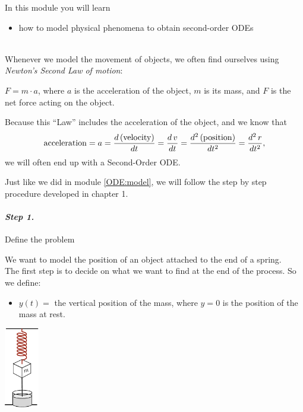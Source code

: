 In this module you will learn
\begin{itemize}
	\item how to model physical phenomena to obtain second-order ODEs
\end{itemize}

\hfill \\


Whenever we model the movement of objects, we often find ourselves using \emph{Newton's Second Law of motion}:

\begin{definition}
	$F = m \cdot a$, \quad
	where $a$ is the acceleration of the object, $m$ is its mass, and $F$ is the net force acting on the object.
\end{definition}

Because this ``Law'' includes the acceleration of the object, and we know that
$$
{\rm acceleration} = a = \frac{d\,({\rm velocity})}{dt} = \frac{d\,v}{dt} = \frac{d^2 \, ({\rm position})}{dt^2} = \frac{d^2\,r}{dt^2},
$$
we will often end up with a Second-Order ODE.

Just like we did in module \ref{ODE:model}, we will follow the step by step procedure developed in chapter 1.

\paragraph{\emph{Step 1.}} Define the problem

\begin{example}

\begin{minipage}{.75\textwidth}
We want to model the position of an object attached to the end of a spring. \\

The first step is to decide on what we want to find at the end of the process. 
So we define:
\begin{itemize}
	\item $y(t) =$ the vertical position of the mass, where $y=0$ is the position of the mass at rest.
\end{itemize}
\end{minipage}
\hfill
\begin{minipage}{44pt}
\includegraphics*[height=100pt]{images/module16-spring-mass-dashpot.pdf}	
\end{minipage}
\end{example}


